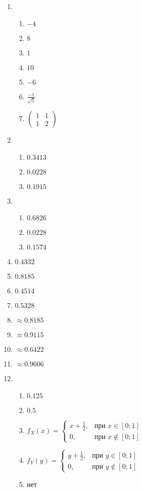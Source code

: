 \begin{multicols}{2}
\begin{enumerate}
\item
\begin{enumerate}
\item $-4$
\item $8 $
\item $1 $
\item $10$
\item $-6$
\item$ \frac{-1}{\sqrt{5}}$

\item $\begin{pmatrix}
 1 & 1 \\
 1 & 2
\end{pmatrix}$
\end{enumerate}
\item
\begin{enumerate}
\item $0.3413$
\item $0.0228$
\item $0.1915$
\end{enumerate}

\item
\begin{enumerate}
\item $0.6826$
\item $0.0228$
\item $0.1574$
\end{enumerate}

\item $0.4332$
\item $0.8185$
\item $0.4514$
\item $0.5328$
\item $\approx 0.8185$
\item $\approx 0.9115$
\item $\approx 0.6422$
\item $\approx 0.9606$

\item
\begin{enumerate}
\item $0.125$
\item $0.5$
\item $f_{X}(x) = \begin{cases} x+\frac{1}{2}, & \text{при } x \in [0;1] \\ 0 , & \text{при } x \not\in [0;1] \end{cases}$
\item $f_{Y}(y) = \begin{cases} y+\frac{1}{2}, & \text{при } y \in [0;1] \\ 0 , & \text{при } y \not\in [0;1] \end{cases}$
\item нет
\end{enumerate}


\end{enumerate}
\end{multicols}
